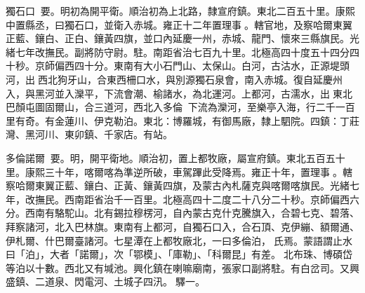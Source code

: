 \begin{pinyinscope}
獨石口：要。明初為開平衛。順治初為上北路，隸宣府鎮。東北二百五十里。康熙中置縣丞，曰獨石口，並衛入赤城。雍正十二年置理事。轄官地，及察哈爾東翼正藍、鑲白、正白、鑲黃四旗，並口內延慶一州，赤城、龍門、懷來三縣旗民。光緒七年改撫民。副將防守尉。駐。南距省治七百九十里。北極高四十度五十四分四十秒。京師偏西四十分。東南有大小石門山、太保山。白河，古沽水，正源堤頭河，出西北狗牙山，合東西柵口水，與別源獨石泉會，南入赤城。復自延慶州入，與黑河並入灤平，下流會潮、榆諸水，為北運河。上都河，古濡水，出東北巴顏屯圖固爾山，合三道河，西北入多倫，下流為灤河，至樂亭入海，行二千一百里有奇。有金蓮川、伊克勒泊。東北：博羅城，有御馬廠，隸上駟院。四鎮：丁莊灣、黑河川、東卯鎮、千家店。有站。

多倫諾爾：要。明，開平衛地。順治初，置上都牧廠，屬宣府鎮。東北五百五十里。康熙三十年，喀爾喀為準逆所破，車駕蹕此受降焉。雍正十年，置理事。轄察哈爾東翼正藍、鑲白、正黃、鑲黃四旗，及蒙古內札薩克與喀爾喀旗民。光緒七年，改撫民。西南距省治千一百里。北極高四十二度二十八分二十秒。京師偏西六分。西南有駱駝山。北有錫拉穆楞河，自內蒙古克什克騰旗入，合碧七克、碧落、拜察諸河，北入巴林旗。東南有上都河，自獨石口入，合石頂、克伊繃、額爾通、伊札爾、什巴爾臺諸河。七星潭在上都牧廠北，一曰多倫泊，氏焉。蒙語謂止水曰「泊」，大者「諾爾」，次「鄂模」、「庫勒」、「科爾昆」有差。北布珠、博碩岱等泊以十數。西北又有堿池。興化鎮在喇嘛廟南，張家口副將駐。有白岔司。又興盛鎮、二道泉、閃電河、土城子四汛。驛一。


\end{pinyinscope}
